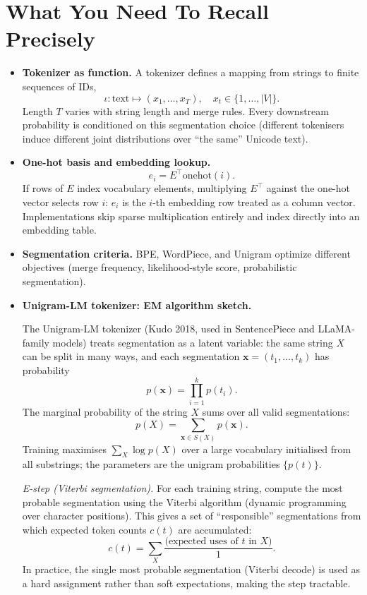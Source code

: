 \section*{What You Need To Recall Precisely}
\begin{itemize}[leftmargin=1.5em]
  \item \textbf{Tokenizer as function.} A tokenizer defines a mapping from strings to finite sequences of IDs,
  \[
    \iota:\text{text}\mapsto (x_1,\dots,x_T),\quad x_t\in\{1,\dots,|V|\}.
  \]
  Length $T$ varies with string length and merge rules. Every downstream probability is conditioned on this segmentation choice (different tokenisers induce different joint distributions over ``the same'' Unicode text).
  \item \textbf{One-hot basis and embedding lookup.}
  \[
    e_i = E^\top \mathrm{onehot}(i).
  \]
  If rows of $E$ index vocabulary elements, multiplying $E^\top$ against the one-hot vector selects row $i$: $e_i$ is the $i$-th embedding row treated as a column vector. Implementations skip sparse multiplication entirely and index directly into an embedding table.
  \item \textbf{Segmentation criteria.} BPE, WordPiece, and Unigram optimize different objectives (merge frequency, likelihood-style score, probabilistic segmentation).

  \item \textbf{Unigram-LM tokenizer: EM algorithm sketch.}

  The Unigram-LM tokenizer (Kudo 2018, used in SentencePiece and LLaMA-family models) treats segmentation as a latent variable: the same string $X$ can be split in many ways, and each segmentation $\mathbf{x}=(t_1,\dots,t_k)$ has probability
  \[
    p(\mathbf{x}) = \prod_{i=1}^{k} p(t_i).
  \]
  The marginal probability of the string $X$ sums over all valid segmentations:
  \[
    p(X) = \sum_{\mathbf{x} \in S(X)} p(\mathbf{x}).
  \]
  Training maximises $\sum_X \log p(X)$ over a large vocabulary initialised from all substrings; the parameters are the unigram probabilities $\{p(t)\}$.

  \emph{E-step (Viterbi segmentation).} For each training string, compute the most probable segmentation using the Viterbi algorithm (dynamic programming over character positions). This gives a set of ``responsible'' segmentations from which expected token counts $c(t)$ are accumulated:
  \[
    c(t) = \sum_{X} \frac{\text{(expected uses of } t \text{ in } X)}{1}.
  \]
  In practice, the single most probable segmentation (Viterbi decode) is used as a hard assignment rather than soft expectations, making the step tractable.


\end{itemize}
